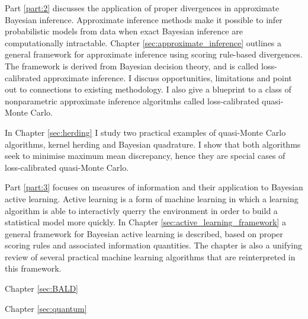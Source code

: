Part \ref{part:2} discusses the application of proper divergences in approximate Bayesian inference. Approximate inference methods make it possible to infer probabilistic models from data when exact Bayesian inference are computationally intractable. Chapter \ref{sec:approximate_inference} outlines a general framework for approximate inference using scoring rule-based divergences. The framework is derived from Bayesian decision theory, and is called loss-calibrated approximate inference. I discuss opportunities, limitations and point out to connections to existing methodology. I also give a blueprint to a class of nonparametric approximate inference algoritmhs called loss-calibrated quasi-Monte Carlo.

In Chapter \ref{sec:herding} I study two practical examples of quasi-Monte Carlo algorithms, kernel herding and Bayesian quadrature. I show that both algorithms seek to minimise maximum mean discrepancy, hence they are special cases of loss-calibrated quasi-Monte Carlo. 

Part \ref{part:3} focuses on measures of information and their application to Bayesian active learning. Active learning is a form of machine learning in which a learning algorithm is able to interactivly querry the environment in order to build a statistical model more quickly. In Chapter \ref{sec:active_learning_framework} a general framework for Bayesian active learning is described, based on proper scoring rules and associated information quantities. The chapter is also a unifying review of several practical machine learning algorithms that are reinterpreted in this framework.

Chapter \ref{sec:BALD} 

Chapter \ref{sec:quantum}